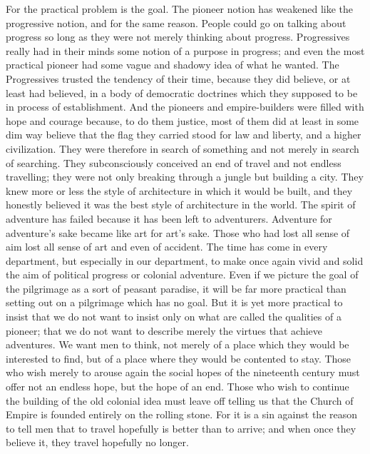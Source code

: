 \documentclass{book}
\begin{document}
For the practical problem is the goal. The pioneer notion has weakened like the progressive notion, and for the same reason. People could go on talking about progress so long as they were not merely thinking about progress. Progressives really had in their minds some notion of a purpose in progress; and even the most practical pioneer had some vague and shadowy idea of what he wanted. The Progressives trusted the tendency of their time, because they did believe, or at least had believed, in a body of democratic doctrines which they supposed to be in process of establishment. And the pioneers and empire-builders were filled with hope and courage because, to do them justice, most of them did at least in some dim way believe that the flag they carried stood for law and liberty, and a higher civilization. They were therefore in search of something and not merely in search of searching. They subconsciously conceived an end of travel and not endless travelling; they were not only breaking through a jungle but building a city. They knew more or less the style of architecture in which it would be built, and they honestly believed it was the best style of architecture in the world. The spirit of adventure has failed because it has been left to adventurers. Adventure for adventure’s sake became like art for art’s sake. Those who had lost all sense of aim lost all sense of art and even of accident. The time has come in every department, but especially in our department, to make once again vivid and solid the aim of political progress or colonial adventure. Even if we picture the goal of the pilgrimage as a sort of peasant paradise, it will be far more practical than setting out on a pilgrimage which has no goal. But it is yet more practical to insist that we do not want to insist only on what are called the qualities of a pioneer; that we do not want to describe merely the virtues that achieve adventures. We want men to think, not merely of a place which they would be interested to find, but of a place where they would be contented to stay. Those who wish merely to arouse again the social hopes of the nineteenth century must offer not an endless hope, but the hope of an end. Those who wish to continue the building of the old colonial idea must leave off telling us that the Church of Empire is founded entirely on the rolling stone. For it is a sin against the reason to tell men that to travel hopefully is better than to arrive; and when once they believe it, they travel hopefully no longer.
\end{document}
